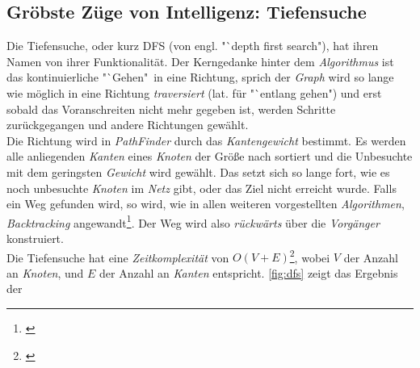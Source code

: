 \documentclass[12pt]{article}
\begin{document}
\subsection{Gröbste Züge von Intelligenz: Tiefensuche}
Die Tiefensuche, oder kurz DFS (von engl. "`depth first search"), hat ihren Namen von ihrer Funktionalität. Der Kerngedanke hinter dem \textit{Algorithmus} ist das kontinuierliche "`Gehen"\ in eine Richtung, sprich der \textit{Graph} wird so lange wie möglich in eine Richtung \textit{traversiert} (lat. für "`entlang gehen") und erst sobald das Voranschreiten nicht mehr gegeben ist, werden Schritte zurückgegangen und andere Richtungen gewählt.
\\
Die Richtung wird in \textit{PathFinder} durch das \textit{Kantengewicht} bestimmt. Es werden alle anliegenden \textit{Kanten} eines \textit{Knoten} der Größe nach sortiert und die Unbesuchte mit dem geringsten \textit{Gewicht} wird gewählt. Das setzt sich so lange fort, wie es noch unbesuchte \textit{Knoten} im \textit{Netz} gibt, oder das Ziel nicht erreicht wurde. Falls ein Weg gefunden wird, so wird, wie in allen weiteren vorgestellten \textit{Algorithmen}, \textit{Backtracking} angewandt\footnote{\cite[Kapitel 22.3, S. 457f]{cormen}}. Der Weg wird also \textit{rückwärts} über die \textit{Vorgänger} konstruiert.
\\
Die Tiefensuche hat eine \textit{Zeitkomplexität} von $O(V + E)$\footnote{\cite[Kapitel 22.3, S. 459]{cormen}}, wobei $V$ der Anzahl an \textit{Knoten}, und $E$ der Anzahl an \textit{Kanten} entspricht. \autoref{fig:dfs} zeigt das Ergebnis der
\end{document}
